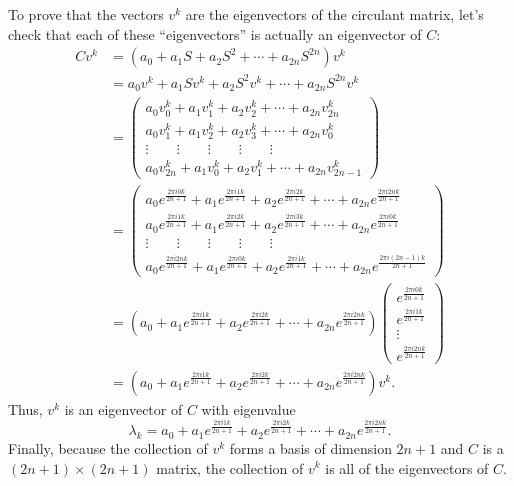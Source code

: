 \documentclass[a4paper,12pt]{article}
\newcommand{\pmat}[1]{\begin{pmatrix} #1 \end{pmatrix}}
\begin{document}
\begin{enumerate}[label = (\arabic*)]
\begin{enumerate}[label = (\alph*)]
		To prove that the vectors $ v^k $ are the eigenvectors of the circulant matrix, let's check that each of these ``eigenvectors'' is actually an eigenvector of $ C $:
		\begin{align*}
			C v^k &= (a_0 + a_1 S + a_2 S^2 + \cdots + a_{2n} S^{2n}) v^k \\
			&= a_0v^k + a_1 Sv^k + a_2 S^2v^k + \cdots + a_{2n} S^{2n}v^k \\
			&= 
			\pmat{
				a_0v_0^k + a_1v_1^k + a_2 v_2^k + \cdots + a_{2n} v_{2n}^k \\
				a_0v_1^k + a_1v_2^k + a_2 v_3^k + \cdots + a_{2n} v_{0}^k \\
				\vdots\qquad\vdots\qquad\vdots\qquad\vdots\qquad\vdots \\
				a_0v_{2n}^k + a_1v_0^k + a_2 v_1^k + \cdots + a_{2n} v_{2n-1}^k
			} \\
			&= 
			\pmat{
				a_0e^{\frac{2\pi i 0 k}{2n + 1}} + a_1e^{\frac{2\pi i 1 k}{2n + 1}} + a_2 e^{\frac{2\pi i 2 k}{2n + 1}} + \cdots + a_{2n} e^{\frac{2\pi i 2n k}{2n + 1}} \\
				a_0e^{\frac{2\pi i 1 k}{2n + 1}} + a_1e^{\frac{2\pi i 2 k}{2n + 1}} + a_2 e^{\frac{2\pi i 3 k}{2n + 1}} + \cdots + a_{2n} e^{\frac{2\pi i 0 k}{2n + 1}} \\
				\vdots\qquad\vdots\qquad\vdots\qquad\vdots\qquad\vdots \\
				a_0e^{\frac{2\pi i 2n k}{2n + 1}} + a_1e^{\frac{2\pi i 0 k}{2n + 1}} + a_2 e^{\frac{2\pi i 1 k}{2n + 1}} + \cdots + a_{2n} e^{\frac{2\pi i (2n-1) k}{2n + 1}}
			} \\
			&= 
			\left(a_0 + a_1e^{\frac{2\pi i 1 k}{2n + 1}} + a_2 e^{\frac{2\pi i 2 k}{2n + 1}} + \cdots + a_{2n} e^{\frac{2\pi i 2n k}{2n + 1}}\right)
			\pmat{
				e^{\frac{2\pi i 0 k}{2n + 1}} \\
				e^{\frac{2\pi i 1 k}{2n + 1}} \\
				\vdots \\
				e^{\frac{2\pi i 2n k}{2n + 1}}
			} \\
			&= \left(a_0 + a_1e^{\frac{2\pi i 1 k}{2n + 1}} + a_2 e^{\frac{2\pi i 2 k}{2n + 1}} + \cdots + a_{2n} e^{\frac{2\pi i 2n k}{2n + 1}}\right) v^k.
		\end{align*}
		Thus, $ v^k $ is an eigenvector of $ C $ with eigenvalue
		\[
			\lambda_k = a_0 + a_1e^{\frac{2\pi i 1 k}{2n + 1}} + a_2 e^{\frac{2\pi i 2 k}{2n + 1}} + \cdots + a_{2n} e^{\frac{2\pi i 2n k}{2n + 1}}.
		\]
		Finally, because the collection of $ v^k $ forms a basis of dimension $ 2n + 1 $ and $ C $ is a $ (2n + 1) \times (2n + 1) $ matrix, the collection of $ v^k $ is all of the eigenvectors of $ C $.
	\end{enumerate}


\end{enumerate}
\end{document}
